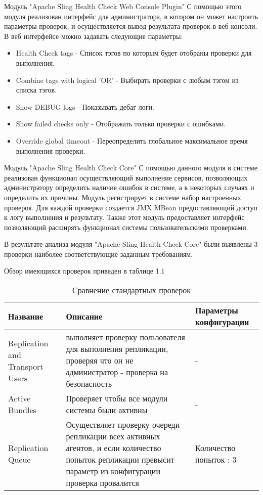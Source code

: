Модуль "Apache Sling Health Check Web Console Plugin"
	С помощью этого модуля реализован интерфейс для администратора, в котором он может настроить параметры проверок, и осуществляется вывод результата проверок в веб-консоли. В веб интерфейсе можно задавать следующие параметры:
\begin{itemize}
\item Health Check tags - Список тэгов по которым будет отобраны проверки для выполнения.
\item Combine tags with logical 'OR' - Выбирать проверки с любым тэгом из списка тэгов.
\item Show DEBUG logs - Показывать дебаг логи.
\item Show failed checks only - Отображать только проверки с ошибками.
\item Override global timeout - Переопределить глобальное максимальное время выполнения проверки.
\end{itemize}

Модуль "Apache Sling Health Check Core"
	С помощью данного модуля в системе реализован функционал осуществляющий выполнение сервисов, позволяющих администратору определить наличие ошибок в системе, а в некоторых случаях и определить их причины. Модуль регистрирует в системе набор настроенных проверок. Для каждой проверки создается JMX MBean предоставляющий доступ к логу выполнения и результату. Также этот модуль предоставляет интерфейс позволяющий расширять функционал системы пользовательскими проверками. 
	 
	В результате анализа модуля "Apache Sling Health Check Core" были выявлены 3 проверки наиболее соответствующие заданным требованиям.
	
	Обзор имеющихся проверок приведен в таблице 1.1
		
\begin{table}[ht]
  \caption{Сравнение стандартных проверок}
  \begin{tabular}{|p{3cm}|p{65mm}|l|}
  \hline
  Название      
  & Описание 
  & Параметры конфигурации \\
  \hline
  Replication and Transport Users  
  & выполняет проверку пользователя для выполнения репликации, проверяя что он не администратор - проверка на безопасность  
  & - \\
  \hline
  Active Bundles       			   
  & Проверяет чтобы все модули системы были активны 
  & - \\
  \hline
  Replication Queue                
  & Осуществляет проверку очереди репликации всех активных агентов, и если количество попыток репликации превысит параметр из конфигурации проверка провалится   
  & Количество попыток : 3 \\
  \hline
  \end{tabular}
  \label{tab:tabular}
\end{table}	
	

